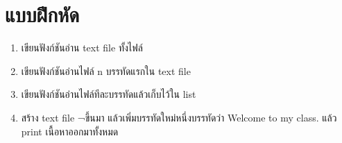 \section{แบบฝึกหัด}
\begin{enumerate} 
\item 	เขียนฟังก์ชันอ่าน text file ทั้งไฟล์
\item 	เขียนฟังก์ชันอ่านไฟล์ n บรรทัดแรกใน text file
\item 	เขียนฟังก์ชันอ่านไฟล์ทีละบรรทัดแล้วเก็บไว้ใน list
\item 	สร้าง text file ¬ขึ้นมา แล้วเพิ่มบรรทัดใหม่หนึ่งบรรทัดว่า Welcome to my class. แล้ว print เนื้อหาออกมาทั้งหมด
\end{enumerate}



